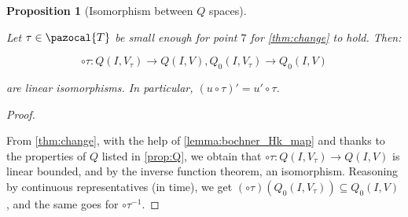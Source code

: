 \documentclass[english,a4paper,9pt,oneside]{scrbook}	%
\theoremstyle{break}
\newtheorem{prop}[equation]{Proposition}
\newenvironment{mproof}[1][\proofname]{%
  \begin{proof}[#1]$ $\par\nobreak\ignorespaces
}{%
  \end{proof}
}
\renewcommand*{\proofname}{Proof}
\theoremstyle{remark}
\newcommand{\norm}[1]{\left\lVert#1\right\rVert}
\newcommand{\tr}{\text{tr}}
\newcommand{\cT}{\pazocal{T}}
\newcommand{\tred}[1]{\textcolor{red}{#1}}
\begin{document}
\begin{appendices}
%
%
%
%
%
%
%
%
%
%		
%


\begin{prop}[Isomorphism between $Q$ spaces]
\label{prop:change_boch}

Let $\tau \in \cT$ be small enough for point $7$ for \ref{thm:change} to hold. Then:

$$\circ \tau : Q(I,V_\tau)\rightarrow Q(I,V), Q_0(I,V_\tau)\rightarrow Q_0(I,V)$$

are linear isomorphisms. In particular, $(u\circ \tau)' = u'\circ \tau$.

\end{prop}

\begin{mproof}
From \cref{thm:change}, with the help of \cref{lemma:bochner_Hk_map} and thanks to the properties of $Q$ listed in \cref{prop:Q}, we obtain that $\circ \tau : Q(I,V_\tau)\rightarrow Q(I,V)$ is linear bounded, and by the inverse function theorem, an isomorphism. Reasoning by continuous representatives (in time), we get $(\circ \tau)(Q_0(I,V_\tau))\subseteq Q_0(I,V)$, and the same goes for $\circ \tau^{-1}$.
\end{mproof}



\end{appendices}
\end{document}
